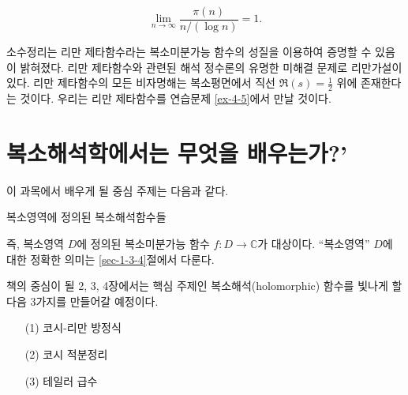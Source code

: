 \begin{itemize}
\begin{salttheorem}[소수정리]{}{} \label{thm-0-1}
$$
\lim_{n\to\infty} \frac{\pi(n)}{n/(\log n)} = 1.
$$
\end{salttheorem}
소수정리는 리만 제타함수라는 복소미분가능 함수의 성질을 이용하여 증명할 수 있음이 밝혀졌다.
리만 제타함수와 관련된 해석 정수론의 유명한 미해결 문제로 리만가설이 있다.
리만 제타함수의 모든 비자명해는 복소평면에서 직선 $\Re(s)=\frac12$ 위에 존재한다는 것이다.
우리는 리만 제타함수를 연습문제 \ref{ex-4-5}에서 만날 것이다.
\end{itemize}


\section*{복소해석학에서는 무엇을 배우는가?'}

이 과목에서 배우게 될 중심 주제는 다음과 같다.


\begin{salt_tcb_line}
\begin{center} 
복소영역에 정의된 복소해석함수들
\end{center}
\end{salt_tcb_line}

즉, 복소영역 $D$에 정의된 복소미분가능 함수 $f \colon D\to \mathbb C$가 대상이다.
``복소영역'' $D$에 대한 정확한 의미는 \ref{sec-1-3-4}절에서 다룬다.

책의 중심이 될 2, 3, 4장에서는
핵심 주제인 복소해석(holomorphic) 함수를 빛나게 할 다음 3가지를 만들어갈 예정이다.
\begin{enumerate}[itemsep=5pt, parsep=0pt]
\item[(1)] 코시-리만 방정식
\item[(2)] 코시 적분정리
\item[(3)] 테일러 급수
\end{enumerate}

